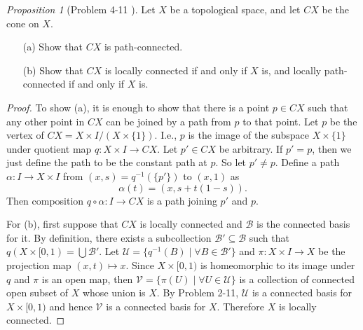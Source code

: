 \documentclass[a4paper]{article}
\theoremstyle{remark}
\newtheorem{prop}{Proposition}
\newcommand{\subhim}{\subseteq} %
\begin{document}
\begin{prop}[Problem 4-11 \cite{LeeTM}]
	Let $X$ be a topological space, and let $CX$ be the cone on $X$. 
	\begin{enumerate}[nolistsep]
		\item[(a)] Show that $CX$ is path-connected.
		\item [(b)] Show that $CX$ is locally connected if and only if $X$ is, and locally path-connected if and only if $X$ is. 
	\end{enumerate}
 \end{prop}
\begin{proof}
	To show (a), it is enough to show that there is a point $p \in CX$ such that any other point in $CX$ can be joined by a path from $p$ to that point. Let $p$ be the vertex of $CX = X \times I / (X \times \{1\})$. I.e., $p$ is the image of the subspace $X \times \{1\}$ under quotient map $q : X \times I \to CX$. Let $p' \in CX$ be arbitrary. If $p'=p$, then we just define the path to be the constant path at $p$. So let $p' \neq p$. Define a path $\alpha : I \to X \times I$ from $(x,s) = q^{-1}(\{p'\})$ to $(x,1)$ as
	$$
	\alpha(t) = (x, s + t(1-s)).
	$$
	Then composition $q \circ \alpha : I \to CX $ is a path joining $p'$ and $p$. 
	
	For (b), first suppose that $CX$ is locally connected and $\mathcal{B}$ is the connected basis for it. By definition, there exists a subcollection $\mathcal{B'} \subhim \mathcal{B}$ such that $q(X \times [0,1) = \bigcup \mathcal{B}'$. Let $\mathcal{U} = \{ q^{-1}(B) \mid \forall B \in \mathcal{B}' \}$ and $\pi : X \times I \to X$ be the projection map $(x,t) \mapsto x$. Since $X \times [0,1)$ is homeomorphic to its image under $q$ and $\pi$ is an open map, then $\mathcal{V} = \{ \pi(U)\mid \forall U \in \mathcal{U} \}$ is a collection of connected open subset of $X$ whose union is $X$. By Problem 2-11, $\mathcal{U}$ is a connected basis for $X \times [0,1)$ and hence $\mathcal{V}$ is a connected basis for $X$. Therefore $X$ is locally connected.
	

\end{proof}
\end{document}
